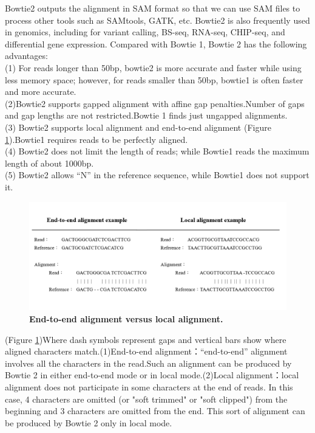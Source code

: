 \documentclass{PHlab-thesis}
\begin{document}
\par
Bowtie2 outputs the alignment in SAM format so that we can use SAM files to process other tools such as SAMtools, GATK, etc. Bowtie2 is also frequently used in genomics, including for variant calling, BS-seq, RNA-seq, CHIP-seq, and differential gene expression. Compared with Bowtie 1, Bowtie 2 has the following advantages:\\
(1) For reads longer than 50bp, bowtie2 is more accurate and faster while using less memory space; however, for reads smaller than 50bp, bowtie1 is often faster and more accurate.\\
(2)Bowtie2 supports gapped alignment with affine gap penalties.Number of gaps and gap lengths are not restricted.Bowtie 1 finds just ungapped alignments.\\
(3) Bowtie2 supports local alignment and end-to-end alignment (Figure \ref{f5}).Bowtie1 requires reads to be perfectly aligned.\\
(4) Bowtie2 does not limit the length of reads; while Bowtie1 reads the maximum length of about 1000bp.\\
(5) Bowtie2 allows “N” in the reference sequence, while Bowtie1 does not support it.\\

\begin{figure}[h]
  \centering
  \includegraphics[scale=0.8]{figures/bowtie2_align.png}
  \caption{\textbf{End-to-end alignment versus local alignment.}
  }
  \label{f5}
\end{figure}

\par
(Figure \ref{f5})Where dash symbols represent gaps and vertical bars show where aligned characters match.(1)End-to-end alignment：“end-to-end” alignment involves all the characters in the read.Such an alignment can be produced by Bowtie 2 in either end-to-end mode or in local mode.(2)Local alignment：local alignment does not participate in some characters at the end of reads. In this case, 4 characters are omitted (or "soft trimmed" or "soft clipped") from the beginning and 3 characters are omitted from the end. This sort of alignment can be produced by Bowtie 2 only in local mode.
\end{document}

